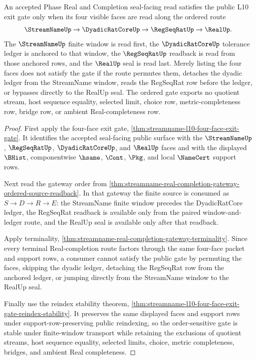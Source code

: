 \begin{theorem}
\label{thm:streamname-l10-four-face-ordered-exit-gate}
An accepted Phase Real and Completion seal-facing read satisfies the public L10 exit gate only when its four visible faces are read along the ordered route
$$
\StreamNameUp \to \DyadicRatCoreUp \to \RegSeqRatUp \to \RealUp .
$$
The $\StreamNameUp$ finite window is read first, the $\DyadicRatCoreUp$ tolerance ledger is anchored to that window, the $\RegSeqRatUp$ readback is read from those anchored rows, and the $\RealUp$ seal is read last. Merely listing the four faces does not satisfy the gate if the route permutes them, detaches the dyadic ledger from the StreamName window, reads the RegSeqRat row before the ledger, or bypasses directly to the RealUp seal. The ordered gate exports no quotient stream, host sequence equality, selected limit, choice row, metric-completeness row, bridge row, or ambient Real-completeness row.
\end{theorem}
\begin{proof}
First apply the four-face exit gate, \autoref{thm:streamname-l10-four-face-exit-gate}. It identifies the accepted seal-facing public surface with the $\StreamNameUp$, $\RegSeqRatUp$, $\DyadicRatCoreUp$, and $\RealUp$ faces and with the displayed $\BHist$, componentwise $\hsame$, $\Cont$, $\Pkg$, and local $\NameCert$ support rows.

Next read the gateway order from \autoref{thm:streamname-real-completion-gateway-ordered-source-readback}. In that gateway the finite source is consumed as $S \longrightarrow D \longrightarrow R \longrightarrow E$: the StreamName finite window precedes the DyadicRatCore ledger, the RegSeqRat readback is available only from the paired window-and-ledger route, and the RealUp seal is available only after that readback.

Apply terminality, \autoref{thm:streamname-real-completion-gateway-terminality}. Since every terminal Real-completion route factors through the same four-face packet and support rows, a consumer cannot satisfy the public gate by permuting the faces, skipping the dyadic ledger, detaching the RegSeqRat row from the anchored ledger, or jumping directly from the StreamName window to the RealUp seal.

Finally use the reindex stability theorem, \autoref{thm:streamname-l10-four-face-exit-gate-reindex-stability}. It preserves the same displayed faces and support rows under support-row-preserving public reindexing, so the order-sensitive gate is stable under finite-window transport while retaining the exclusions of quotient streams, host sequence equality, selected limits, choice, metric completeness, bridges, and ambient Real completeness.
\end{proof}


